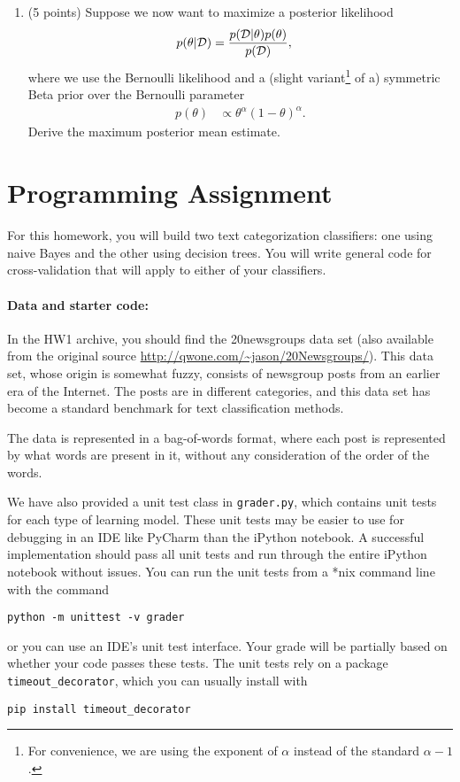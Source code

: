 \documentclass[10pt]{article}
\begin{document}
\begin{enumerate}
\begin{enumerate}
\item (5 points) Suppose we now want to maximize a posterior likelihood
\begin{align}
p(\theta | {\cal D}) &= \frac{p({\cal D} | \theta) p(\theta)}{p({\cal D})},
\end{align}
where we use the Bernoulli likelihood and a (slight variant\footnote{For convenience, we are using the exponent of $\alpha$ instead of the standard $\alpha-1$.} of a) symmetric Beta prior over the Bernoulli parameter
\begin{align}
p(\theta) &\propto \theta^{\alpha} (1 - \theta)^{\alpha}.
\end{align}
Derive the maximum posterior mean estimate.

\end{enumerate}

\end{enumerate}

\section*{Programming Assignment}

For this homework, you will build two text categorization classifiers: one using naive Bayes and the other using decision trees. You will write general code for cross-validation that will apply to either of your classifiers. 

\paragraph{Data and starter code:} In the HW1 archive, you should find the 20newsgroups data set (also available from the original source \url{http://qwone.com/~jason/20Newsgroups/}). This data set, whose origin is somewhat fuzzy, consists of newsgroup posts from an earlier era of the Internet. The posts are in different categories, and this data set has become a standard benchmark for text classification methods. 

The data is represented in a bag-of-words format, where each post is represented by what words are present in it, without any consideration of the order of the words. 

We have also provided a unit test class in \texttt{grader.py}, which contains unit tests for each type of learning model. These unit tests may be easier to use for debugging in an IDE like PyCharm than the iPython notebook. A successful implementation should pass all unit tests and run through the entire iPython notebook without issues. You can run the unit tests from a *nix command line with the command
\begin{verbatim}
python -m unittest -v grader
\end{verbatim}
or you can use an IDE's unit test interface. Your grade will be partially based on whether your code passes these tests. The unit tests rely on a package \texttt{timeout\_decorator}, which you can usually install with
\begin{verbatim}
pip install timeout_decorator
\end{verbatim}
\end{document}
